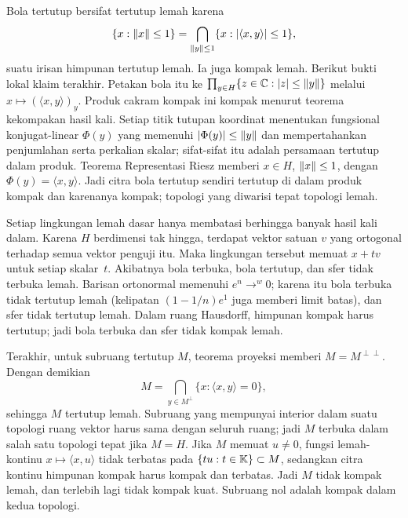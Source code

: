 \begin{o001solution}
\begin{o001proof}
Bola tertutup bersifat tertutup lemah karena
\[
 \{x:\lVert x\rVert\leq1\}
 =\bigcap_{\lVert y\rVert\leq1}\{x:\lvert\langle x,y\rangle\rvert\leq1\},
\]
suatu irisan himpunan tertutup lemah. Ia juga kompak lemah. Berikut bukti
lokal klaim terakhir. Petakan bola itu ke
$\prod_{y\in H}\{z\in\mathbb{C}:\lvert z\rvert\leq\lVert y\rVert\}$ melalui
$x\mapsto(\langle x,y\rangle)_y$. Produk cakram kompak ini kompak menurut
teorema kekompakan hasil kali. Setiap titik tutupan koordinat menentukan
fungsional konjugat-linear $\Phi(y)$ yang memenuhi
$\lvert\Phi(y)\rvert\leq\lVert y\rVert$ dan mempertahankan penjumlahan serta perkalian
skalar; sifat-sifat itu adalah persamaan tertutup dalam produk. Teorema
Representasi Riesz memberi $x\in H$, $\lVert x\rVert\leq1$, dengan
$\Phi(y)=\langle x,y\rangle$. Jadi citra bola tertutup sendiri tertutup di
dalam produk kompak dan karenanya kompak; topologi yang diwarisi tepat
topologi lemah.

Setiap lingkungan lemah dasar hanya membatasi berhingga banyak hasil kali
dalam. Karena $H$ berdimensi tak hingga, terdapat vektor satuan $v$ yang
ortogonal terhadap semua vektor penguji itu. Maka lingkungan tersebut
memuat $x+tv$ untuk setiap skalar~$t$. Akibatnya bola terbuka, bola tertutup,
dan sfer tidak terbuka lemah. Barisan ortonormal memenuhi $e^n\to^w0$;
karena itu bola terbuka tidak tertutup lemah (kelipatan
$(1-1/n)e^1$ juga memberi limit batas), dan sfer tidak tertutup lemah.
Dalam ruang Hausdorff, himpunan kompak harus tertutup; jadi bola terbuka dan
sfer tidak kompak lemah.

Terakhir, untuk subruang tertutup $M$, teorema proyeksi memberi
$M=M^{\perp\perp}$. Dengan demikian
\[
 M=\bigcap_{y\in M^\perp}\{x:\langle x,y\rangle=0\},
\]
sehingga $M$ tertutup lemah. Subruang yang mempunyai interior dalam suatu
topologi ruang vektor harus sama dengan seluruh ruang; jadi $M$ terbuka
dalam salah satu topologi tepat jika $M=H$. Jika $M$ memuat $u\neq0$, fungsi
lemah-kontinu $x\mapsto\langle x,u\rangle$ tidak terbatas pada
$\{tu:t\in\mathbb{K}\}\subset M$, sedangkan citra kontinu himpunan kompak harus
kompak dan terbatas. Jadi $M$ tidak kompak lemah, dan terlebih lagi tidak
kompak kuat. Subruang nol adalah kompak dalam kedua topologi.
\end{o001proof}
\end{o001solution}

